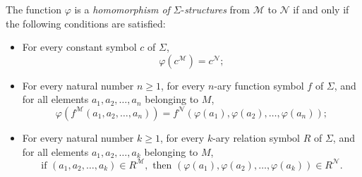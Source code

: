 \begin{definition}
  The function $\varphi$ is a \textit{homomorphism of} $\Sigma$-\textit{structures} from $\mathcal{M}$ to $\mathcal{N}$ if and only if the following conditions are satisfied:
  \begin{itemize}
      \item For every constant symbol $c$ of $\Sigma$,
      \[
      \varphi(c^{\mathcal{M}}) = c^{\mathcal{N}};
      \]
      \item For every natural number $n \geq 1$, for every $n$-ary function symbol $f$ of $\Sigma$, and for all elements $a_1, a_2, \ldots, a_n$ belonging to $M$,
      \[
      \varphi(f^{\mathcal{M}}(a_1, a_2, \ldots, a_n)) = f^{\mathcal{N}}(\varphi(a_1), \varphi(a_2), \ldots, \varphi(a_n));
      \]
      \item For every natural number $k \geq 1$, for every $k$-ary relation symbol $R$ of $\Sigma$, and for all elements $a_1, a_2, \ldots, a_k$ belonging to $M$,
      \[
      \text{if } (a_1, a_2, \ldots, a_k) \in R^{\mathcal{M}}, \text{ then } (\varphi(a_1), \varphi(a_2), \ldots, \varphi(a_k)) \in R^{\mathcal{N}}.
      \]
  \end{itemize}
  \end{definition}

